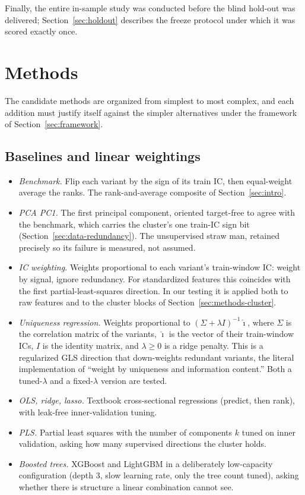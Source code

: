 \documentclass[11pt]{article}
\begin{document}
Finally, the entire in-sample study was conducted before the blind hold-out was
delivered; Section~\ref{sec:holdout} describes the freeze protocol under which it was scored
exactly once.

\FloatBarrier
\section{Methods}
\label{sec:methods}

The candidate methods are organized from simplest to most complex, and each addition must
justify itself against the simpler alternatives under the framework of
Section~\ref{sec:framework}.

\subsection{Baselines and linear weightings}
\label{sec:methods-linear}

\begin{itemize}
\item \emph{Benchmark.} Flip each variant by the sign of its train IC, then
      equal-weight average the ranks. The rank-and-average composite of
      Section~\ref{sec:intro}.
\item \emph{PCA PC1.} The first principal component, oriented target-free to agree
      with the benchmark, which carries the cluster's one train-IC sign bit
      (Section~\ref{sec:data-redundancy}). The unsupervised straw man, retained precisely
      so its failure is measured, not assumed.
\item \emph{IC weighting.} Weights proportional to each variant's train-window IC:
      weight by signal, ignore redundancy. For standardized features this coincides with
      the first partial-least-squares direction. In our testing it is applied both to
      raw features and to the cluster blocks of Section~\ref{sec:methods-cluster}.
\item \emph{Uniqueness regression.} Weights proportional to
      $(\Sigma+\lambda I)^{-1}\hat{\imath}$, where $\Sigma$ is the correlation matrix of
      the variants, $\hat{\imath}$ is the vector of their train-window ICs, $I$ is the
      identity matrix, and $\lambda \ge 0$ is a ridge penalty. This is a regularized
      GLS direction that down-weights redundant variants, the literal implementation of
      ``weight by uniqueness and information content.'' Both a tuned-$\lambda$ and a
      fixed-$\lambda$ version are tested.
\item \emph{OLS, ridge, lasso.} Textbook cross-sectional regressions (predict, then
      rank), with leak-free inner-validation tuning.
\item \emph{PLS.} Partial least squares with the number of components $k$ tuned on
      inner validation, asking how many supervised directions the cluster holds.
\item \emph{Boosted trees.} XGBoost and LightGBM in a deliberately low-capacity
      configuration (depth 3, slow learning rate, only the tree count tuned), asking
      whether there is structure a linear combination cannot see.
\end{itemize}
\end{document}
